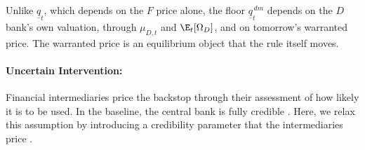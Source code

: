 \begin{yaddblock}
Unlike $\underline q_t$, which depends on the $F$ price alone, the floor
$\underline q^{\,dm}_t$ depends on the $D$ bank's own valuation, through
$\mu_{D,t}$ and $\E_t[\Omega_D]$, and on tomorrow's warranted price. The warranted
price is an equilibrium object that the rule itself moves.
\end{yaddblock}

\paragraph{Uncertain Intervention: }Financial intermediaries price the backstop through their assessment of how likely it is to be used. In the baseline,  the central bank is fully credible . Here, we relax this assumption by introducing a  credibility parameter\yadd{, $\vartheta\in[0,1]$,} that the intermediaries price .

